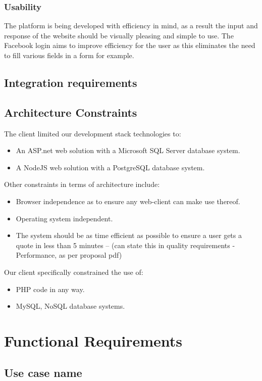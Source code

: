 \documentclass{article}
\begin{document}
		\subsubsection{Usability}
		The platform is being developed with efficiency in mind, as a result the input and response of the website should be visually pleasing and simple to use. The Facebook login aims to improve efficiency for the user as this eliminates the need to fill various fields in a form for example.

		

	\subsection{Integration requirements}
	
	\subsection{Architecture Constraints}
	The client limited our development stack technologies to:
	\begin{itemize}
		\item An ASP.net web solution with a Microsoft SQL Server database system.
		\item A NodeJS web solution with a PostgreSQL database system.
	\end{itemize}
	Other constraints in terms of architecture include:
	\begin{itemize}
		\item Browser independence as to ensure any web-client can make use thereof.
		\item Operating system independent.
		\item The system should be as time efficient as possible to ensure a user gets a quote in less than 5 minutes -- (can state this in quality requirements -Performance, as per proposal pdf)
		\end{itemize}
	Our client specifically constrained the use of:
		\begin{itemize}
		\item PHP code in any way.
		\item MySQL, NoSQL database systems.
		\end{itemize}
	

\section{Functional Requirements}

	\subsection{Use case name}
\end{document}
